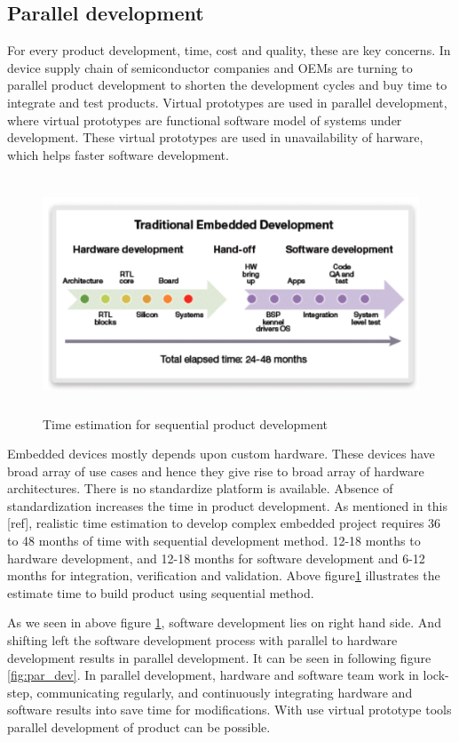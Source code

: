 \subsection{Parallel development}
For every product development, time, cost and quality, these are key concerns. In device supply chain of semiconductor companies and OEMs are turning to parallel product development to shorten the development cycles and buy time to integrate  and test products. Virtual prototypes are used in parallel development, where virtual prototypes are functional software model of systems under development. These virtual prototypes are used in unavailability of harware, which helps faster software development. 

\begin{figure}[h!]
\includegraphics[width=12cm, height=7cm]{./images/seq_dev}
\centering
\caption{Time estimation for sequential product development}
\label{fig:seqn_dev}
\end{figure}

\par Embedded devices mostly depends upon custom hardware. These devices have broad array of use cases and hence they give rise to broad array of hardware architectures. There is no standardize platform is available. Absence of standardization increases  the time in product development. As mentioned in this [ref], realistic time estimation to develop complex embedded project requires 36 to 48 months of time with sequential development method.  12-18 months to hardware development, and 12-18 months for software development and 6-12 months for integration, verification and validation. Above figure\ref{fig:seqn_dev} illustrates the estimate time to build product using sequential method.

\par As we seen in above figure \ref{fig:seqn_dev}, software development lies on right hand side. And shifting left the software development process with parallel to hardware development results in parallel development. It can be seen in following figure \ref{fig:par_dev}. In parallel development, hardware and software team work in lock-step, communicating regularly, and continuously integrating hardware and software results into save time for modifications. With use virtual prototype tools parallel development of product can be possible. 

